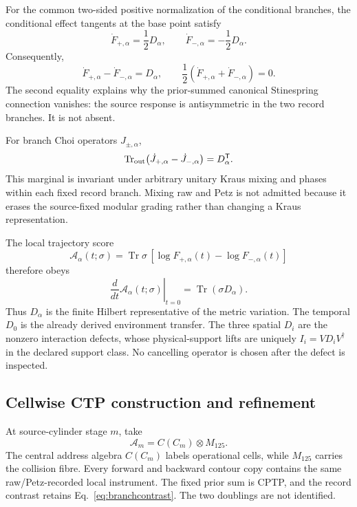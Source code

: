 \documentclass[11pt]{article}
\theoremstyle{definition}
\theoremstyle{remark}
\begin{document}
For the common two-sided positive normalization of the conditional branches, the conditional effect tangents at the base point satisfy
\begin{equation}\label{eq:branchcontrast}
 \dot F_{+,\alpha}=\frac12D_\alpha,
 \qquad
 \dot F_{-,\alpha}=-\frac12D_\alpha.
\end{equation}
Consequently,
\begin{equation}
 \dot F_{+,\alpha}-\dot F_{-,\alpha}=D_\alpha,
 \qquad
 \frac12(\dot F_{+,\alpha}+\dot F_{-,\alpha})=0.
\end{equation}
The second equality explains why the prior-summed canonical Stinespring connection vanishes: the source response is antisymmetric in the two record branches. It is not absent.

For branch Choi operators $J_{\pm,\alpha}$,
\begin{equation}
 \operatorname{Tr}_{\rm out}
 \bigl(\dot J_{+,\alpha}-\dot J_{-,\alpha}\bigr)
 =D_\alpha^{\mathsf T}.
\end{equation}
This marginal is invariant under arbitrary unitary Kraus mixing and phases within each fixed record branch. Mixing raw and Petz is not admitted because it erases the source-fixed modular grading rather than changing a Kraus representation.

The local trajectory score
\begin{equation}
 \mathcal A_\alpha(t;\sigma)=
 \operatorname{Tr}\sigma\,[\log F_{+,\alpha}(t)-\log F_{-,\alpha}(t)]
\end{equation}
therefore obeys
\begin{equation}
 \left.\frac{d}{dt}\mathcal A_\alpha(t;\sigma)\right|_{t=0}
 =\operatorname{Tr}(\sigma D_\alpha).
\end{equation}
Thus $D_\alpha$ is the finite Hilbert representative of the metric variation. The temporal $D_0$ is the already derived environment transfer. The three spatial $D_i$ are the nonzero interaction defects, whose physical-support lifts are uniquely $I_i=VD_iV^\dagger$ in the declared support class. No cancelling operator is chosen after the defect is inspected.

\subsection{Cellwise CTP construction and refinement}

At source-cylinder stage $m$, take
\begin{equation}
 \mathcal A_m=C(C_m)\otimes M_{125}.
\end{equation}
The central address algebra $C(C_m)$ labels operational cells, while $M_{125}$ carries the collision fibre. Every forward and backward contour copy contains the same raw/Petz-recorded local instrument. The fixed prior sum is CPTP, and the record contrast retains Eq.~\eqref{eq:branchcontrast}. The two doublings are not identified.
\end{document}
